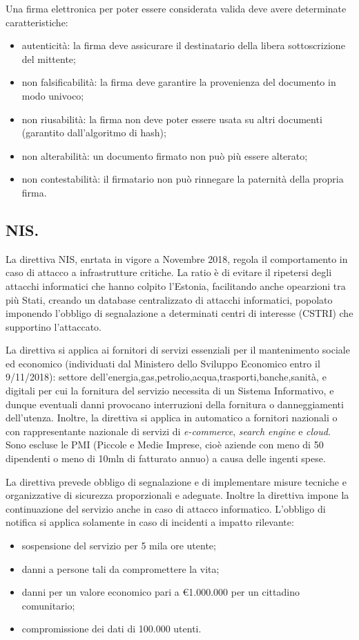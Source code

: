 \documentclass[a4page, 11pt, twocolumn]{article}
\begin{document}
Una firma elettronica per poter essere considerata valida deve avere determinate caratteristiche:
\begin{itemize}
\item autenticità: la firma deve assicurare il destinatario della libera sottoscrizione del mittente;
\item non falsificabilità: la firma deve garantire la provenienza del documento in modo univoco;
\item non riusabilità: la firma non deve poter essere usata su altri documenti (garantito dall'algoritmo di hash);
\item non alterabilità: un documento firmato non può più essere alterato;
\item non contestabilità: il firmatario non può rinnegare la paternità della propria firma.
\end{itemize}

\subsection{NIS.}
La direttiva NIS, enrtata in vigore a Novembre 2018, regola il comportamento in caso di attacco a infrastrutture critiche.
La ratio è di evitare il ripetersi degli attacchi informatici che hanno colpito l'Estonia, facilitando anche opearzioni tra più Stati, creando un database centralizzato di attacchi informatici, popolato imponendo l'obbligo di segnalazione a determinati centri di interesse (CSTRI) che supportino l'attaccato.

La direttiva si applica ai fornitori di servizi essenziali per il mantenimento sociale ed economico (individuati dal Ministero dello Sviluppo Economico entro il 9/11/2018): settore dell'energia,gas,petrolio,acqua,trasporti,banche,sanità, e digitali per cui la fornitura del servizio necessita di un Sistema Informativo, e dunque eventuali danni provocano interruzioni della fornitura o danneggiamenti dell'utenza.
Inoltre, la direttiva si applica in automatico a fornitori nazionali o con rappresentante nazionale di servizi di \textit{e-commerce}, \textit{search engine} e \textit{cloud}.
Sono escluse le PMI (Piccole e Medie Imprese, cioè aziende con meno di 50 dipendenti o meno di 10mln di fatturato annuo) a causa delle ingenti spese.

La direttiva prevede obbligo di segnalazione e di implementare misure tecniche e organizzative di sicurezza proporzionali e adeguate.
Inoltre la direttiva impone la continuazione del servizio anche in caso di attacco informatico.
L'obbligo di notifica si applica solamente in caso di incidenti a impatto rilevante:
\begin{itemize}
\item sospensione del servizio per 5 mila ore utente;
\item danni a persone tali da compromettere la vita;
\item danni per un valore economico pari a \euro{1.000.000} per un cittadino comunitario;
\item compromissione dei dati di 100.000 utenti.
\end{itemize}
\end{document}
